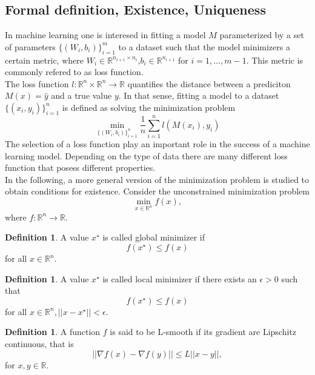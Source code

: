 \documentclass[12pt]{article}
\theoremstyle{definition}
\newtheorem{definition}[theorem]{Definition}
\numberwithin{equation}{section}
\begin{document}
\subsection{Formal definition, Existence, Uniqueness}
In machine learning one is interesed in fitting a model $M$ parameterized by a set of parameters $\{(W_i,b_i)\}_{i=1}^m$ to a dataset such that the model minimizers a certain metric, where $W_i \in \mathbb{R}^{n_{i+1} \times n_i}$,$b_i \in \mathbb{R}^{n_{i+1}}$ for $i = 1,\dots,m-1$. This metric is commonly refered to as loss function. \\
The loss function $l:\mathbb{R}^n \times \mathbb{R}^n \rightarrow \mathbb{R}$ quantifies the distance between a prediciton $M(x) = \hat{y}$ and a true value $y$. In that sense, fitting a model to a dataset $\{(x_i,y_i)\}_{i=1}^n$ is defined as solving the minimization problem
\begin{equation}
  \min_{\{(W_i,b_i)\}_{i=1}^n} \frac{1}{n}\sum_{i=1}^n l(M(x_i), y_i)
\end{equation}
The selection of a loss function play an important role in the success of a machine learning model. Depending on the type of data there are many different loss function that posess different properties. \\
In the following, a more general version of the minimization problem is studied to obtain conditions for existence.
Consider the unconstrained minimization problem
\begin{equation}
  \min_{x \in \mathbb{R}^n} f(x),
\end{equation}
where $f:\mathbb{R}^n \rightarrow \mathbb{R}$.
\begin{definition}
  A value $x^\star$ is called global minimizer if 
  \begin{equation}
    f(x^\star) \leq f(x)
  \end{equation} 
  for all $x \in \mathbb{R}^n$.
\end{definition}
\begin{definition}
  A value $x^\star$ is called local minimizer if there exists an $\epsilon > 0$ such that
  \begin{equation}
    f(x^\star) \leq f(x)
  \end{equation} 
  for all $x \in \mathbb{R}^n, ||x-x^\star|| < \epsilon$.
\end{definition}

\begin{definition}
  A function $f$ is said to be L-smooth if its gradient are Lipschitz continuous, that is 
  \begin{equation}
    ||\nabla f(x) - \nabla f(y) || \leq L ||x-y||,
  \end{equation}
  for $x,y \in \mathbb{R}$.
\end{definition}
\end{document}
